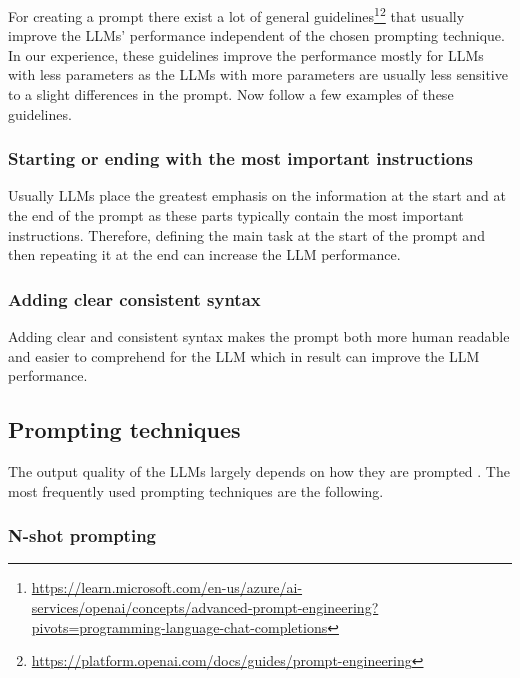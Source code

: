 For creating a prompt there exist a lot of general guidelines\footnote{\url{https://learn.microsoft.com/en-us/azure/ai-services/openai/concepts/advanced-prompt-engineering?pivots=programming-language-chat-completions}}\footnote{\url{https://platform.openai.com/docs/guides/prompt-engineering}} that usually improve the LLMs' performance independent of the chosen prompting technique. In our experience, these guidelines improve the performance mostly for LLMs with less parameters as the LLMs with more parameters are usually less sensitive to a slight differences in the prompt. Now follow a few examples of these guidelines.

\subsubsection{Starting or ending with the most important instructions}
Usually LLMs place the greatest emphasis on the information at the start and at the end of the prompt as these parts typically contain the most important instructions. Therefore, defining the main task at the start of the prompt and then repeating it at the end can increase the LLM performance.


\subsubsection{Adding clear consistent syntax}
Adding clear and consistent syntax makes the prompt both more human readable and easier to comprehend for the LLM which in result can improve the LLM performance.



\subsection{Prompting techniques}

The output quality of the LLMs largely depends on how they are prompted \cite{Brown2020,Wei2022}. The most frequently used prompting techniques are the following.


\subsubsection{N-shot prompting}

